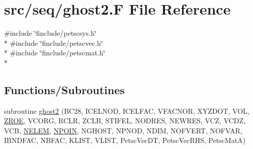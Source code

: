 \hypertarget{seq_2ghost2_8_f}{\section{src/seq/ghost2.F File Reference}
\label{seq_2ghost2_8_f}
}
{\ttfamily \#include \char`\"{}finclude/petscsys.\-h\char`\"{}}\\*
{\ttfamily \#include \char`\"{}finclude/petscvec.\-h\char`\"{}}\\*
{\ttfamily \#include \char`\"{}finclude/petscmat.\-h\char`\"{}}\\*
\subsection*{Functions/\-Subroutines}
\begin{DoxyCompactItemize}
\item 
subroutine \hyperlink{seq_2ghost2_8_f_ada232e5267a40e4a7bb3766949b709a7}{ghost2} (B\-C28, I\-C\-E\-L\-N\-O\-D, I\-C\-E\-L\-F\-A\-C, V\-F\-A\-C\-N\-O\-R, X\-Y\-Z\-D\-O\-T, V\-O\-L, \hyperlink{myts_8com_a0c4fbcdb78e6b50c8919d714e4b5a694}{Z\-R\-O\-E}, V\-C\-O\-R\-G, R\-C\-L\-R, Z\-C\-L\-B, S\-T\-I\-F\-E\-L, N\-O\-D\-R\-E\-S, N\-E\-W\-R\-E\-S, V\-C\-Z, V\-C\-D\-Z, V\-C\-B, \hyperlink{mesh_8com_aee5e75b79d0e815c0603cfbccc618957}{N\-E\-L\-E\-M}, \hyperlink{mesh_8com_ae28c1572321efcd8715b974d87d20c58}{N\-P\-O\-I\-N}, N\-G\-H\-O\-S\-T, N\-P\-N\-O\-D, N\-D\-I\-M, N\-O\-F\-V\-E\-R\-T, N\-O\-F\-V\-A\-R, I\-B\-N\-D\-F\-A\-C, N\-B\-F\-A\-C, K\-L\-I\-S\-T, V\-L\-I\-S\-T, Petsc\-Vec\-D\-T, Petsc\-Vec\-R\-H\-S, Petsc\-Mat\-A)
\end{DoxyCompactItemize}


